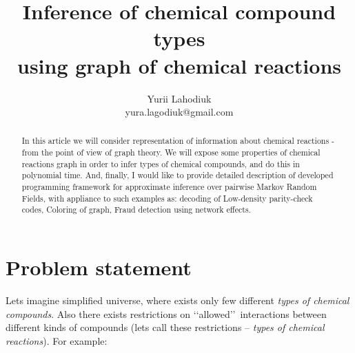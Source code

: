 \documentclass[10pt]{article}
\begin{document}
\title{Inference of chemical compound types \\ using graph of chemical reactions}
\author{Yurii Lahodiuk \\ yura.lagodiuk@gmail.com}
\date{}
\maketitle

\begin{abstract}
In this article we will consider representation of information about chemical reactions - from the point of view of graph theory. We will expose some properties of chemical reactions graph in order to infer types of chemical compounds, and do this in polynomial time. And, finally, I would like to provide detailed description of developed programming framework\cite{project_on_github} for approximate inference over pairwise Markov Random Fields, with appliance to such examples as: decoding of Low-density parity-check codes, Coloring of graph, Fraud detection using network effects\cite{fraud_detection}.
\end{abstract}

\section{Problem statement}
Lets imagine simplified universe, where exists only few different \emph{types of chemical compounds}. 
Also there exists restrictions on \lq \lq allowed\rq \rq\ interactions between different kinds of compounds (lets call these restrictions -- \emph{types of chemical reactions}). For example:
\end{document}
